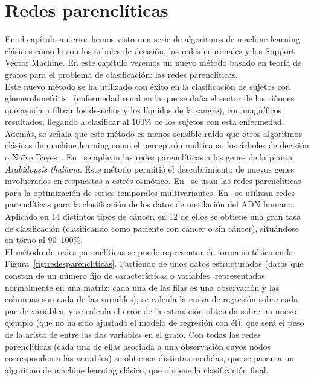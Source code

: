 \chapter{Redes parenclíticas}\label{cap:redes_parencliticas}

En el capítulo anterior hemos visto una serie de algoritmos de machine learning clásicos como lo son los árboles de decisión, las redes neuronales y los Support Vector Machine. En este capítulo veremos un nuevo método basado en teoría de grafos para el problema de clasificación: las redes parenclíticas.\\

Este nuevo método se ha utilizado con éxito en la clasificación de sujetos con glomerolunefritis~\cite{metabo3010155, 1304.1896} (enfermedad renal en la que se daña el sector de los riñones que ayuda a filtrar los desechos y los líquidos de la sangre), con magníficos resultados, llegando a clasificar al 100\% de los sujetos con esta enfermedad. Además, se señala que este método es menos sensible ruido que otros algoritmos clásicos de machine learning como el perceptrón multicapa, los árboles de decisión o Naïve Bayes~\cite{metabo3010155}. En~\cite{Zanin2014} se aplican las redes parenclíticas a los genes de la planta \textit{Arabidopsis thaliana}. Este método permitió el descubrimiento de nuevos genes involucrados en respuestas a estrés osmótico. En~\cite{Zanin2012} se usan las redes parenclíticas para la optimización de series temporales multivariantes. En~\cite{1506.04421} se utilizan redes parenclíticas para la clasificación de los datos de metilación del ADN humano. Aplicado en 14 distintos tipos de cáncer, en 12 de ellos se obtiene una gran tasa de clasificación (clasificando como paciente con cáncer o sin cáncer), situándose en torno al 90--100\%.\\

El método de redes parenclíticas se puede representar de forma sintética en la Figura~\ref{fig:redesparencliticas}. Partiendo de unos datos estructurados (datos que constan de un número fijo de características o variables, representados normalmente en una matriz: cada una de las filas es una observación y las columnas son cada de las variables), se calcula la curva de regresión sobre cada par de variables, y se calcula el error de la estimación obtenida sobre un nuevo ejemplo (que no ha sido ajustado el modelo de regresión con él), que será el peso de la arista de entre las dos variables en el grafo. Con todas las redes parenclíticas (cada una de ellas asociada a una observación cuyos nodos corresponden a las variables) se obtienen distintas medidas, que se pasan a un algoritmo de machine learning clásico, que obtiene la clasificación final.     

